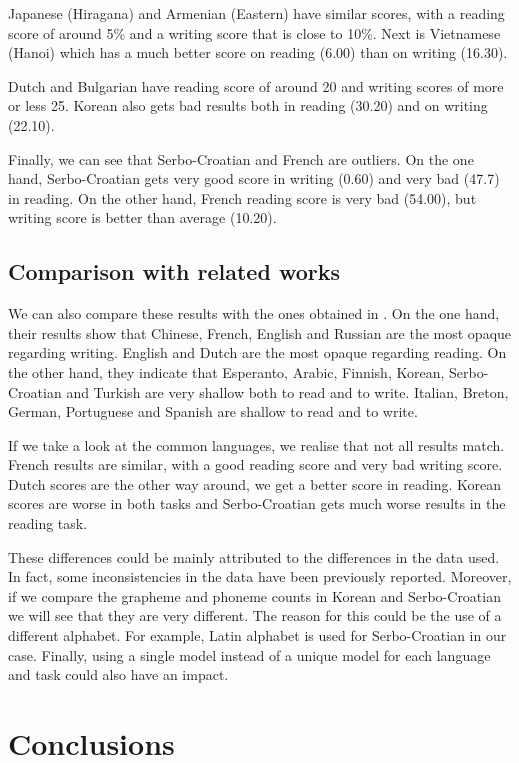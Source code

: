 \documentclass[11pt,a4paper]{article}
\begin{document}
Japanese (Hiragana) and Armenian (Eastern) have similar scores, with a reading score of around 5\% and a writing score that is close to 10\%. Next is Vietnamese (Hanoi) which has a much better score on reading (6.00) than on writing (16.30).

Dutch and Bulgarian have reading score of around 20 and writing scores of more or less 25. Korean also gets bad results both in reading (30.20) and on writing (22.10).

Finally, we can see that Serbo-Croatian and French are outliers. On the one hand, Serbo-Croatian gets very good score in writing (0.60) and very bad (47.7) in reading. On the other hand, French reading score is very bad (54.00), but writing score is better than average (10.20).

\subsection{Comparison with related works}

We can also compare these results with the ones obtained in \citet{marjou2021oteann}. On the one hand, their results show that Chinese, French, English and Russian are the most opaque regarding writing. English and Dutch are the most opaque regarding reading. On the other hand, they indicate that Esperanto, Arabic, Finnish, Korean, Serbo-Croatian and Turkish are very shallow both to read and to write. Italian, Breton, German, Portuguese and Spanish are shallow to read and to write.

If we take a look at the common languages, we realise that not all results match. French results are similar, with a good reading score and very bad writing score. Dutch scores are the other way around, we get a better score in reading. Korean scores are worse in both tasks and Serbo-Croatian gets much worse results in the reading task.

These differences could be mainly attributed to the differences in the data used. In fact, some inconsistencies in the data have been previously reported. Moreover, if we compare the grapheme and phoneme counts in Korean and Serbo-Croatian we will see that they are very different. The reason for this could be the use of a different alphabet. For example, Latin alphabet is used for Serbo-Croatian in our case. Finally, using a single model instead of a unique model for each language and task could also have an impact.

\section{Conclusions}
\end{document}
